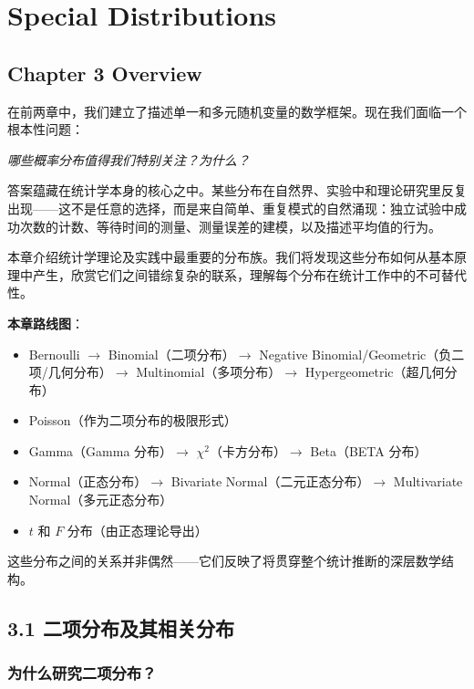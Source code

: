 \chapter{Special Distributions}\label{chap:special-distributions-ch3}

\section*{Chapter 3 Overview}

在前两章中，我们建立了描述单一和多元随机变量的数学框架。现在我们面临一个根本性问题：

\begin{center}
\textit{哪些概率分布值得我们特别关注？为什么？}
\end{center}

答案蕴藏在统计学本身的核心之中。某些分布在自然界、实验中和理论研究里反复出现——这不是任意的选择，而是来自简单、重复模式的自然涌现：独立试验中成功次数的计数、等待时间的测量、测量误差的建模，以及描述平均值的行为。

本章介绍统计学理论及实践中最重要的分布族。我们将发现这些分布如何从基本原理中产生，欣赏它们之间错综复杂的联系，理解每个分布在统计工作中的不可替代性。

\textbf{本章路线图}：
\begin{itemize}
\item Bernoulli $\to$ Binomial（二项分布）$\to$ Negative Binomial/Geometric（负二项/几何分布）$\to$ Multinomial（多项分布）$\to$ Hypergeometric（超几何分布）
\item Poisson（作为二项分布的极限形式）
\item Gamma（Gamma 分布）$\to$ $\chi^{2}$（卡方分布）$\to$ Beta（BETA 分布）
\item Normal（正态分布）$\to$ Bivariate Normal（二元正态分布）$\to$ Multivariate Normal（多元正态分布）
\item $t$ 和 $F$ 分布（由正态理论导出）
\end{itemize}

这些分布之间的关系并非偶然——它们反映了将贯穿整个统计推断的深层数学结构。

\section{3.1 二项分布及其相关分布}\label{sec:binomial-related-ch3}

\subsection{为什么研究二项分布？}

